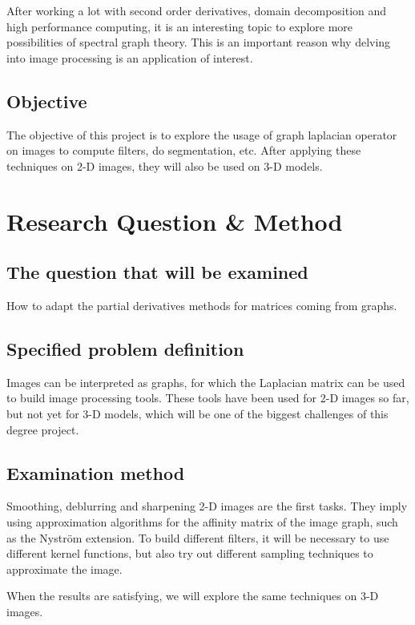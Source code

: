 \documentclass[12pt]{article}
\begin{document}
After working a lot with second order derivatives, domain decomposition and high performance computing, it is an interesting topic to explore more possibilities of spectral graph theory.
This is an important reason why delving into image processing is an application of interest.

\subsection*{Objective}

The objective of this project is to explore the usage of graph laplacian operator on images to compute filters, do segmentation, etc.
After applying these techniques on 2-D images, they will also be used on 3-D models.

\section*{Research Question \& Method}

\subsection*{The question that will be examined}

How to adapt the partial derivatives methods for matrices coming from graphs.

\subsection*{Specified problem definition}

Images can be interpreted as graphs, for which the Laplacian matrix can be used to build image processing tools.
These tools have been used for 2-D images so far, but not yet for 3-D models, which will be one of the biggest challenges of this degree project.

\subsection*{Examination method}

Smoothing, deblurring and sharpening 2-D images are the first tasks.
They imply using approximation algorithms for the affinity matrix of the image graph, such as the Nystr\"om extension.
To build different filters, it will be necessary to use different kernel functions, but also try out different sampling techniques to approximate the image.

When the results are satisfying, we will explore the same techniques on 3-D images.
\end{document}
